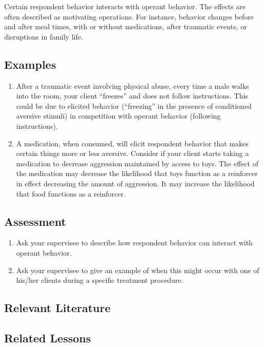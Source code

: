 Certain respondent behavior interacts with operant behavior. The effects are often described as motivating operations. For instance, behavior changes before and after meal times, with or without medications, after traumatic events, or disruptions in family life. 

\subsection{Examples}
\begin{enumerate}
\item  After a traumatic event involving physical abuse, every time a male walks into the room, your client ``freezes'' and does not follow instructions. This could be due to elicited behavior (``freezing'' in the presence of conditioned aversive stimuli) in competition with operant behavior (following instructions).
\item A medication, when consumed, will elicit respondent behavior that makes certain things more or less aversive. Consider if your client starts taking a medication to decrease aggression maintained by access to toys. The effect of the medication may decrease the likelihood that toys function as a reinforcer in effect decreasing the amount of aggression. It may increase the likelihood that food functions as a reinforcer.
\end{enumerate}
%
\subsection{Assessment}
\begin{enumerate}
\item Ask your supervisee to describe how respondent behavior can interact with operant behavior.
\item Ask your supervisee to give an example of when this might occur with one of his/her clients during a specific treatment procedure.
\end{enumerate}
%
\subsection{Relevant Literature}
\begin{refsection}
\nocite{cooper2007applied,
        pierce2013behavior,
        davis1977operant}
\printbibliography[heading=none]
\end{refsection}
%
\subsection{Related Lessons}
\fourgTwo{}\\
\fourgFive{}\\
\fourFKSeven{}\\
\fourFKThirteen{}\\
\fourFKFourteen{}\\
\fourFKFifteen{}\\
